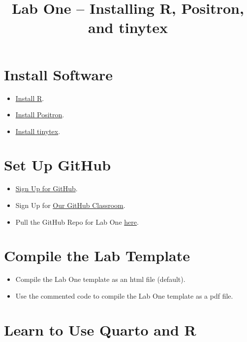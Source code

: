 \documentclass[
]{article}
\title{Lab One -- Installing R, Positron, and tinytex}
\author{}
\date{}
\providecommand{\tightlist}{%
  \setlength{\itemsep}{0pt}\setlength{\parskip}{0pt}}
\begin{document}
\maketitle


\normalsize

\normalsize

\section{Install Software}\label{install-software}

\begin{itemize}
\tightlist
\item
  \href{https://cran.r-project.org/}{Install R}.
\item
  \href{https://positron.posit.co/download.html}{Install Positron}.
\item
  \href{https://yihui.org/tinytex/}{Install tinytex}.
\end{itemize}

\section{Set Up GitHub}\label{set-up-github}

\begin{itemize}
\tightlist
\item
  \href{https://github.com/}{Sign Up for GitHub}.
\item
  Sign Up for
  \href{https://classroom.github.com/classrooms/156721198-colgateuniversitycipolli-sp2026-math240}{Our
  GitHub Classroom}.
\item
  Pull the GitHub Repo for Lab One
  \href{https://classroom.github.com/a/8jPlfX90}{here}.
\end{itemize}

\section{Compile the Lab Template}\label{compile-the-lab-template}

\begin{itemize}
\tightlist
\item
  Compile the Lab One template as an html file (default).
\item
  Use the commented code to compile the Lab One template as a pdf file.
\end{itemize}

\section{Learn to Use Quarto and R}\label{learn-to-use-quarto-and-r}
\end{document}
